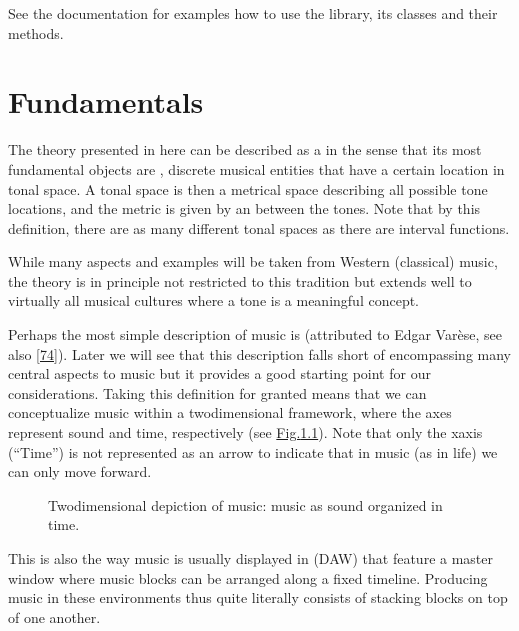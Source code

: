 \documentclass[letterpaper,10pt,english]{sphinxmanual}
\begin{document}
\sphinxAtStartPar
See the documentation {\hyperref[\detokenize{api:api}]{}} for examples how to use the library,
its classes and their methods.


\chapter{Fundamentals}
\label{\detokenize{1_fundamentals:fundamentals}}\label{\detokenize{1_fundamentals::doc}}
\sphinxAtStartPar
The theory presented in here can be described
as a  in the sense
that its most fundamental objects are ,
discrete musical entities that have
a certain location in tonal space.
A tonal space is then a metrical space
describing all possible tone locations,
and the metric is given by an 
between the tones. Note that by this definition,
there are as many different tonal spaces
as there are interval functions.

\sphinxAtStartPar
While many aspects and examples will be taken
from Western (classical) music, the theory is
in principle not restricted to this
tradition but extends well to virtually all musical cultures
where a tone is a meaningful concept.

\sphinxAtStartPar
Perhaps the most simple description of music
is  (attributed to
Edgar Varèse, see also {[}\hyperlink{cite.8_bibliography:id43}{74}{]}).
Later we will see that this description falls short
of encompassing many central aspects to music
but it provides a good starting point for our considerations.
Taking this definition for granted
means that we can conceptualize music within
a two\sphinxhyphen{}dimensional framework, where the axes
represent sound and time, respectively (see \hyperref[\detokenize{1_fundamentals:fig-soundtime}]{Fig.\@ \ref{\detokenize{1_fundamentals:fig-soundtime}}}).
Note that only the x\sphinxhyphen{}axis (“Time”)
is not represented as an arrow to indicate
that in music (as in life) we can only move forward.
\begin{figure}[htbp]\centering\capstart{}\caption{Two\sphinxhyphen{}dimensional depiction of music: music as sound organized in time.}\label{\detokenize{1_fundamentals:id7}}\label{\detokenize{1_fundamentals:fig-soundtime}}\end{figure}
\sphinxAtStartPar
This is also the way music is usually displayed
in  (DAW) that feature
a master window where music blocks can be arranged
along a fixed timeline. Producing music in
these environments thus quite literally consists
of stacking blocks on top of one another.
\end{document}
